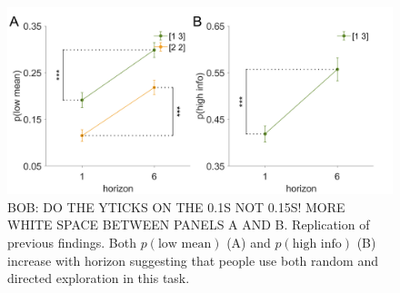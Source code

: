 \documentclass[12pt]{article}
\begin{document}
	
	
	
	
	\begin{figure}[H]
		\begin{center}
			\includegraphics[width=\textwidth]{figures/line_modelfree.png}
			\caption{BOB: DO THE YTICKS ON THE 0.1S NOT 0.15S!  MORE WHITE SPACE BETWEEN PANELS A AND B.
			Replication of previous findings. Both  $p(\mbox{low mean})$ (A) and $p(\mbox{high info})$ (B) increase with horizon suggesting that people use both random and directed exploration in this task.  }%
			\label{fig:modelfree}
		\end{center}
	\end{figure}
	
\end{document}

